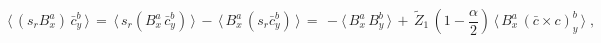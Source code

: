 \begin{equation}
  \label{auxDSE1}
        \langle  \, (s_r B^a_x ) \, \bar
  c^b_y\, \rangle   \, =\,   \langle  \, s_r (B^a_x  \, \bar
  c^b_y ) \, \rangle   \, - \,    \langle  \, B^a_x  \,(s_r  \bar
  c^b_y ) \, \rangle   \, = \, - \langle \,  B^a_x \,  B^b_y \, \rangle \, + \,
  \widetilde Z_1\, (1-\frac \alpha 2 )  \,  \langle \,  B^a_x \,  
  (\bar c \times c )^b_y
  \, \rangle  \; ,
\end{equation}


